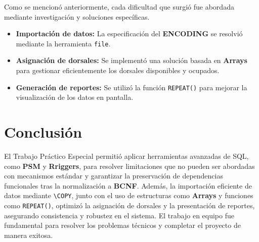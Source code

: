 \documentclass{article}
\begin{document}
Como se mencionó anteriormente, cada dificultad que surgió fue abordada mediante investigación y soluciones específicas.

\begin{itemize}[leftmargin=*]
    \item \textbf{Importación de datos:} La especificación del \textbf{ENCODING} se resolvió mediante la herramienta \texttt{file}.
    \item \textbf{Asignación de dorsales:} Se implementó una solución basada en \textbf{Arrays} para gestionar eficientemente los dorsales disponibles y ocupados.
    \item \textbf{Generación de reportes:} Se utilizó la función \texttt{REPEAT()} para mejorar la visualización de los datos en pantalla.
\end{itemize}

\section{Conclusión}

El Trabajo Práctico Especial permitió aplicar herramientas avanzadas de SQL, como \textbf{PSM} y \textbf{Rriggers}, para resolver limitaciones que no pueden ser abordadas con mecanismos estándar y garantizar la preservación de dependencias funcionales tras la normalización a \textbf{BCNF}. Además, la importación eficiente de datos mediante \texttt{\textbackslash COPY}, junto con el uso de estructuras como \textbf{Arrays} y funciones como \texttt{REPEAT()}, optimizó la asignación de dorsales y la presentación de reportes, asegurando consistencia y robustez en el sistema. El trabajo en equipo fue fundamental para resolver los problemas técnicos y completar el proyecto de manera exitosa.
\end{document}
